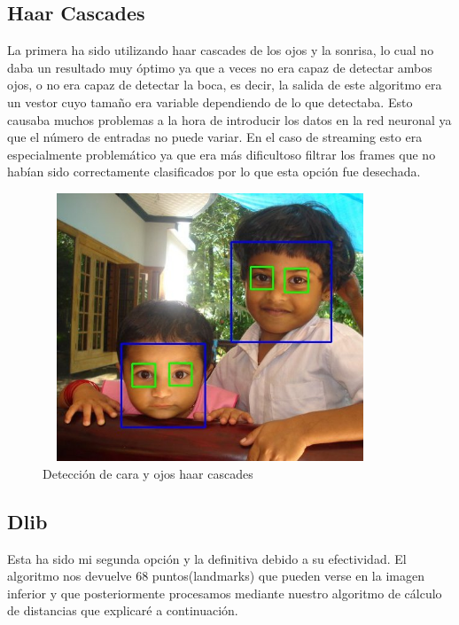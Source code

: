 \documentclass{article}
\begin{document}
\subsection{Haar Cascades}
La primera ha sido utilizando haar cascades de los ojos y la sonrisa, lo cual no daba un resultado muy óptimo ya que a veces no era capaz de detectar ambos ojos, o no era capaz de detectar la boca, es decir, la salida de este algoritmo era un vestor cuyo tamaño era variable dependiendo de lo que detectaba. Esto causaba muchos problemas a la hora de introducir los datos en la red neuronal ya que el número de entradas no puede variar. En el caso de streaming esto era especialmente problemático ya que era más dificultoso filtrar los frames que no habían sido correctamente clasificados por lo que esta opción fue desechada.

\begin{figure}[H]
  \centering
  \includegraphics[width=100mm, height=80mm]{images/face_detection_haar_cascades.jpg}
  \caption{Detección de cara y ojos haar cascades}
\end{figure}

\subsection{Dlib}
Esta ha sido mi segunda opción y la definitiva debido a su efectividad. El algoritmo nos devuelve 68 puntos(landmarks) que pueden verse en la imagen inferior y que posteriormente procesamos mediante nuestro algoritmo de cálculo de distancias que explicaré a continuación.
 
\end{document}
